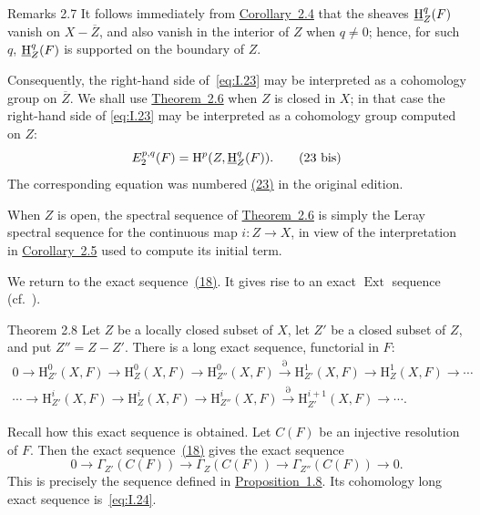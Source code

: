 \begin{sgaremark}{Remarks 2.7}
It follows immediately from \hyperref[I.2.4]{Corollary~2.4} that the sheaves $\mathop{\underline{\mathrm H}}\nolimits_Z^q(F)$
vanish on $X-\overline Z$, and also vanish in the interior of $Z$ when
$q\ne0$; hence, for such $q$, $\mathop{\underline{\mathrm H}}\nolimits_Z^q(F)$ is supported on the boundary of
$Z$.

Consequently, the right-hand side of~\eqref{eq:I.23} may be interpreted as a
cohomology group on $\overline Z$. We shall use \hyperref[I.2.6]{Theorem~2.6} when $Z$ is
closed in $X$; in that case the right-hand side of
\eqref{eq:I.23} may be interpreted as a cohomology group computed on $Z$:
\begin{equation}
  E_2^{p,q}(F)=\mathrm H^p(Z,\mathop{\underline{\mathrm H}}\nolimits_Z^q(F)).
  \tag{23 bis}\label{eq:I.23bis}
\end{equation}
The corresponding equation was numbered \hyperref[eq:I.23]{(23)} in the original edition.
\end{sgaremark}

When $Z$ is open, the spectral sequence of \hyperref[I.2.6]{Theorem~2.6} is simply the Leray
spectral sequence for the continuous map $i\colon Z\to X$, in view of the
interpretation in \hyperref[I.2.5]{Corollary~2.5} used to compute its initial term.

We return to the exact sequence~\hyperref[eq:I.18]{(18)}. It gives rise to an exact
$\operatorname{Ext}$ sequence (cf.\ \cite{Tohoku}).

\begin{sgastatement}{Theorem 2.8}
Let $Z$ be a locally closed subset of $X$, let $Z'$ be a closed subset of
$Z$, and put $Z''=Z-Z'$. There is a long exact sequence, functorial in $F$:
\begin{equation}
\begin{gathered}
  0\longrightarrow \mathrm H_{Z'}^0(X,F)
  \longrightarrow \mathrm H_Z^0(X,F)
  \longrightarrow \mathrm H_{Z''}^0(X,F)
  \xrightarrow{\partial} \mathrm H_{Z'}^1(X,F)
  \longrightarrow \mathrm H_Z^1(X,F)\longrightarrow\cdots \\
  \cdots\longrightarrow \mathrm H_{Z'}^i(X,F)
  \longrightarrow \mathrm H_Z^i(X,F)
  \longrightarrow \mathrm H_{Z''}^i(X,F)
  \xrightarrow{\partial} \mathrm H_{Z'}^{i+1}(X,F)
  \longrightarrow\cdots .
\end{gathered}
\tag{24}\label{eq:I.24}
\end{equation}
\end{sgastatement}

Recall how this exact sequence is obtained. Let $C(F)$ be an injective
resolution of $F$. Then the exact sequence~\hyperref[eq:I.18]{(18)} gives the exact sequence
\begin{equation}
  0\longrightarrow\Gamma_{Z'}(C(F))
  \longrightarrow\Gamma_Z(C(F))
  \longrightarrow\Gamma_{Z''}(C(F))
  \longrightarrow0.
  \tag{25}\label{eq:I.25}
\end{equation}
This is precisely the sequence defined in \hyperref[I.1.8]{Proposition~1.8}. Its cohomology
long exact sequence is~\eqref{eq:I.24}.

